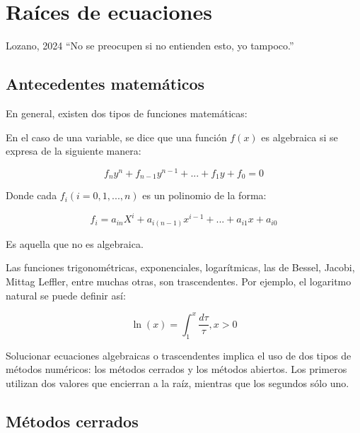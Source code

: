 \chapter{Raíces de ecuaciones}

\begin{chapquote}{Lozano, 2024}
    ``No se preocupen si no entienden esto, yo tampoco.''
\end{chapquote}


\section{Antecedentes matemáticos}

En general, existen dos tipos de funciones matemáticas:

\begin{definition}
	En el caso de una variable, se dice que una función \(f(x)\) es
	algebraica si se expresa de la siguiente manera:

	\[
		f_n y^n + f_{n-1} y^{n-1} + ... + f_1 y + f_0 = 0
	\]

	Donde cada \(f_i (i = 0, 1, ..., n)\) es un polinomio de la forma:

	\[
		f_i = a_{in} X^i + a_{i(n-1)} x^{i-1} + ... + a_{i1} x + a_{i0}
	\]
\end{definition}

\begin{definition}
	Es aquella que no es algebraica.
\end{definition}

\begin{eg}
	Las funciones trigonométricas, exponenciales, logarítmicas, las de
	Bessel, Jacobi, Mittag Leffler, entre muchas otras, son trascendentes.
	Por ejemplo, el logaritmo natural se puede definir así:

	\[
		\boxed{\ln(x) = \int_1^x \frac{d \tau}{\tau}, x > 0}
	\]

\end{eg}

Solucionar ecuaciones algebraicas o trascendentes implica el uso de dos tipos de
métodos numéricos: los métodos cerrados y los métodos abiertos. Los primeros
utilizan dos valores que encierran a la raíz, mientras que los segundos sólo
uno.

\section{Métodos cerrados}

